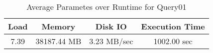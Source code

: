 \documentclass[../../main.tex]{subfiles}
\begin{document}
    \begin{table}
        \begin{center}
            \begin{tabular}{ |c|c|c|c| } 
            \hline
            Load & Memory & Disk IO & Execution Time\\
            \hline
            7.39 & 38187.44 MB & 3.23 MB/sec & 1002.00 sec \\
            \hline
            \end{tabular}
            \\[1pt]
            \caption{Average Parametes over Runtime for Query01}
        \end{center}
    \end{table}
    \pagebreak
\end{document}
